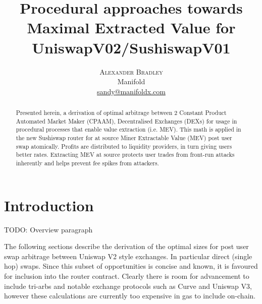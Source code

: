\documentclass{article}
\author{%
	\textsc{Alexander Bradley} \\[1ex] %
	\normalsize Manifold \\ %
	\normalsize \href{mailto:sandy@manifoldx.com}{sandy@manifoldx.com} %
}
\begin{document}


\title{Procedural approaches towards Maximal Extracted Value for UniswapV02/SushiswapV01} %



\maketitle


\begin{abstract}
	Presented herein, a derivation of optimal arbitrage between 2 Constant Product Automated Market Maker (CPAAM), Decentralised Exchanges (DEXs) for usage in procedural processes that enable value extraction (i.e. MEV).
	This math is applied in the new Sushiswap router for at source Miner Extractable Value (MEV) post user swap atomically.
	Profits are distributed to liquidity providers, in turn giving users better rates. Extracting MEV at source protects user trades from front-run attacks inherently and helps prevent fee spikes from attackers.
\end{abstract}

\newpage

\section{Introduction}

TODO: Overview paragraph


The following sections describe the derivation of the optimal sizes for post user swap arbitrage between Uniswap V2 style exchanges.
In particular direct (single hop) swaps. Since this subset of opportunities is concise and known, it is favoured for inclusion into the router contract. Clearly there is room for advancement to include tri-arbs and notable exchange protocols such as Curve and Uniswap V3, however these calculations are currently too expensive in gas to include on-chain.
\end{document}
